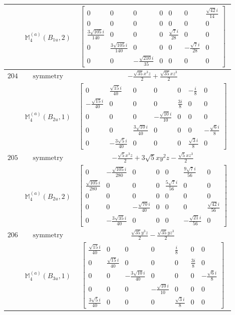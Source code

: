 \documentclass[fleqn,8pt,landscape]{jsarticle}
\begin{document}
\begin{longtable}{ccc}
$  $ & $ \mathbb{M}_{4}^{(a)}(B_{1u},2) $ & $ \begin{bmatrix} 0 & 0 & 0 & 0 & 0 & 0 & \frac{\sqrt{42} i}{14} \\ 0 & 0 & 0 & 0 & 0 & 0 & 0 \\ \frac{3 \sqrt{105} i}{140} & 0 & 0 & 0 & \frac{\sqrt{7} i}{28} & 0 & 0 \\ 0 & \frac{3 \sqrt{105} i}{140} & 0 & 0 & 0 & - \frac{\sqrt{7} i}{28} & 0 \\ 0 & 0 & - \frac{\sqrt{210} i}{35} & 0 & 0 & 0 & 0 \end{bmatrix} $ \\ \hline
$ 204 $ & $ \text{symmetry} $ & $ - \frac{\sqrt{35} x^{3} z}{2} + \frac{\sqrt{35} x z^{3}}{2} $ \\
$  $ & $ \mathbb{M}_{4}^{(a)}(B_{2u},1) $ & $ \begin{bmatrix} 0 & \frac{\sqrt{15} i}{40} & 0 & 0 & 0 & - \frac{i}{8} & 0 \\ - \frac{\sqrt{15} i}{40} & 0 & 0 & 0 & \frac{3 i}{8} & 0 & 0 \\ 0 & 0 & 0 & - \frac{\sqrt{10} i}{10} & 0 & 0 & 0 \\ 0 & 0 & \frac{3 \sqrt{10} i}{40} & 0 & 0 & 0 & - \frac{\sqrt{6} i}{8} \\ 0 & - \frac{3 \sqrt{5} i}{40} & 0 & 0 & 0 & \frac{\sqrt{3} i}{8} & 0 \end{bmatrix} $ \\ \hline
$ 205 $ & $ \text{symmetry} $ & $ - \frac{\sqrt{5} x^{3} z}{2} + 3 \sqrt{5} x y^{2} z - \frac{\sqrt{5} x z^{3}}{2} $ \\
$  $ & $ \mathbb{M}_{4}^{(a)}(B_{2u},2) $ & $ \begin{bmatrix} 0 & - \frac{\sqrt{105} i}{280} & 0 & 0 & 0 & \frac{9 \sqrt{7} i}{56} & 0 \\ \frac{\sqrt{105} i}{280} & 0 & 0 & 0 & \frac{5 \sqrt{7} i}{56} & 0 & 0 \\ 0 & 0 & 0 & 0 & 0 & 0 & 0 \\ 0 & 0 & - \frac{\sqrt{70} i}{40} & 0 & 0 & 0 & \frac{\sqrt{42} i}{56} \\ 0 & - \frac{3 \sqrt{35} i}{40} & 0 & 0 & 0 & - \frac{\sqrt{21} i}{56} & 0 \end{bmatrix} $ \\ \hline
$ 206 $ & $ \text{symmetry} $ & $ \frac{\sqrt{35} y^{3} z}{2} - \frac{\sqrt{35} y z^{3}}{2} $ \\
$  $ & $ \mathbb{M}_{4}^{(a)}(B_{3u},1) $ & $ \begin{bmatrix} \frac{\sqrt{15} i}{40} & 0 & 0 & 0 & \frac{i}{8} & 0 & 0 \\ 0 & \frac{\sqrt{15} i}{40} & 0 & 0 & 0 & \frac{3 i}{8} & 0 \\ 0 & 0 & - \frac{3 \sqrt{10} i}{40} & 0 & 0 & 0 & - \frac{\sqrt{6} i}{8} \\ 0 & 0 & 0 & - \frac{\sqrt{10} i}{10} & 0 & 0 & 0 \\ \frac{3 \sqrt{5} i}{40} & 0 & 0 & 0 & \frac{\sqrt{3} i}{8} & 0 & 0 \end{bmatrix} $ \\ \hline

\end{longtable}
\end{document}
